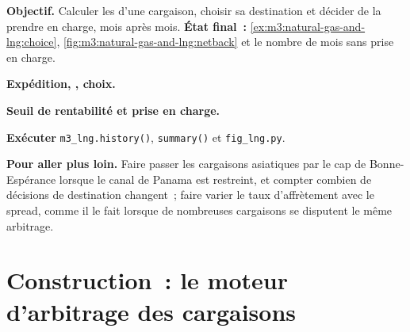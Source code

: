 \begin{tutorial}
\textbf{Objectif.} Calculer les  d'une cargaison, choisir sa destination et décider de la prendre en charge,
mois après mois. \textbf{État final~:}
\cref{ex:m3:natural-gas-and-lng:choice}, \cref{fig:m3:natural-gas-and-lng:netback} et
le nombre de mois sans prise en charge.
\begin{tutsteps}
\item \textbf{Expédition, , choix.}
\label{lst:m3:natural-gas-and-lng:netback}
\item \textbf{Seuil de rentabilité et prise en charge.}
\label{lst:m3:natural-gas-and-lng:lift}
\item \textbf{Exécuter} \texttt{m3\_lng.history()}, \texttt{summary()} et \texttt{fig\_lng.py}.
\end{tutsteps}
\textbf{Pour aller plus loin.} Faire passer les cargaisons asiatiques par le cap de Bonne-Espérance lorsque le canal de
Panama est restreint, et compter combien de décisions de destination changent~; faire varier le taux d'affrètement avec le
spread, comme il le fait lorsque de nombreuses cargaisons se disputent le même arbitrage.
\end{tutorial}

\section{Construction~: le moteur d'arbitrage des cargaisons}\label{bld:m3:natural-gas-and-lng:lngarb}

